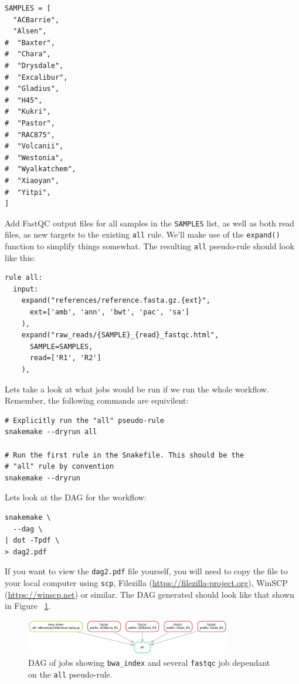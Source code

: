 \begin{lstlisting}
SAMPLES = [
  "ACBarrie",
  "Alsen",
#  "Baxter",
#  "Chara",
#  "Drysdale",
#  "Excalibur",
#  "Gladius",
#  "H45",
#  "Kukri",
#  "Pastor",
#  "RAC875",
#  "Volcanii",
#  "Westonia",
#  "Wyalkatchem",
#  "Xiaoyan",
#  "Yitpi",
]
\end{lstlisting}

Add FastQC output files for all samples in the \texttt{SAMPLES} list, as well as both read files, as new targets to the existing \texttt{all} rule.
We'll make use of the \texttt{expand()} function to simplify things somewhat.
The resulting \texttt{all} pseudo-rule should look like this:

\begin{lstlisting}
rule all:
  input:
    expand("references/reference.fasta.gz.{ext}",
      ext=['amb', 'ann', 'bwt', 'pac', 'sa']
    ),
    expand("raw_reads/{SAMPLE}_{read}_fastqc.html",
      SAMPLE=SAMPLES,
      read=['R1', 'R2']
    ),
\end{lstlisting}

Lets take a look at what jobs would be run if we run the whole workflow.
Remember, the following commands are equivilent:

\begin{lstlisting}
# Explicitly run the "all" pseudo-rule
snakemake --dryrun all

# Run the first rule in the Snakefile. This should be the
# "all" rule by convention
snakemake --dryrun
\end{lstlisting}

Lets look at the DAG for the workflow:

\begin{lstlisting}
snakemake \
  --dag \
| dot -Tpdf \
> dag2.pdf
\end{lstlisting}

\begin{warning}

If you want to view the \texttt{dag2.pdf} file yourself, you will need to copy the file to your local computer using \texttt{scp}, Filezilla (\url{https://filezilla-project.org}), WinSCP (\url{https://winscp.net}) or similar.
The DAG generated should look like that shown in Figure ~\ref{fig:dag2}.

\end{warning}

\begin{figure}[H]
\centering
\includegraphics[width=0.8\textwidth]{handout/dag2.pdf}
\caption{DAG of jobs showing \texttt{bwa\_index} and several \texttt{fastqc} job dependant on the \texttt{all} pseudo-rule.}
\label{fig:dag2}
\end{figure}


